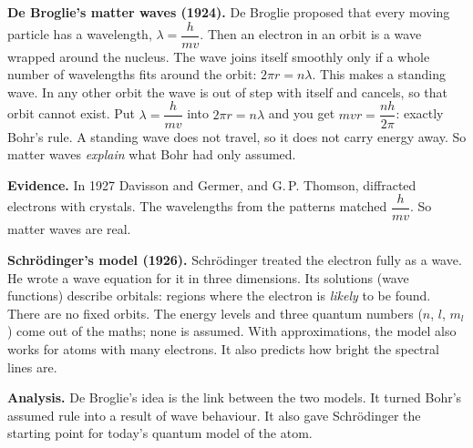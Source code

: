 \begin{practiceanswers}
\begin{practiceans}
\begin{modelanswer}
  \textbf{De Broglie's matter waves (1924).} De Broglie proposed that every moving particle
  has a wavelength, $\lambda = \dfrac{h}{mv}$. Then an electron in an orbit is a wave
  wrapped around the nucleus. The wave joins itself smoothly only if a whole number of
  wavelengths fits around the orbit: $2\pi r = n\lambda$. This makes a standing wave. In any
  other orbit the wave is out of step with itself and cancels, so that orbit cannot exist.
  Put $\lambda = \dfrac{h}{mv}$ into $2\pi r = n\lambda$ and you get $mvr = \dfrac{nh}{2\pi}$:
  exactly Bohr's rule. A standing wave does not travel, so it does not carry energy away. So
  matter waves \emph{explain} what Bohr had only assumed.

  \textbf{Evidence.} In 1927 Davisson and Germer, and G.\,P. Thomson, diffracted electrons
  with crystals. The wavelengths from the patterns matched $\dfrac{h}{mv}$. So matter waves
  are real.

  \textbf{Schrödinger's model (1926).} Schrödinger treated the electron fully as a wave. He
  wrote a wave equation for it in three dimensions. Its solutions (wave functions) describe
  orbitals: regions where the electron is \emph{likely} to be found. There are no fixed
  orbits. The energy levels and three quantum numbers ($n$, $l$, $m_l$) come out of the maths;
  none is assumed. With approximations, the model also works for atoms with many electrons.
  It also predicts how bright the spectral lines are.

  \textbf{Analysis.} De Broglie's idea is the link between the two models. It turned Bohr's
  assumed rule into a result of wave behaviour. It also gave Schrödinger the starting point
  for today's quantum model of the atom.
  \end{modelanswer}
  \begin{markingcriteria}
  \end{markingcriteria}
\end{practiceans}


\end{practiceanswers}
